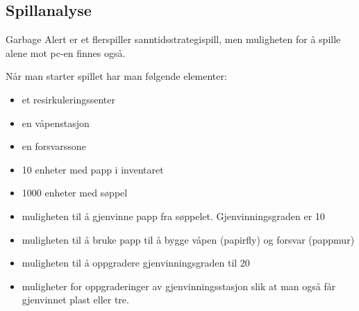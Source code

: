 

\subsection{Spillanalyse}

Garbage Alert er et flerspiller sanntidsstrategispill, men muligheten for å spille alene mot pc-en finnes også. 

Når man starter spillet har man følgende elementer:

\begin{itemize}
	\item et resirkuleringssenter
	\item en våpenstasjon
	\item en forsvarssone
	\item 10 enheter med papp i inventaret
	\item 1000 enheter med søppel
	\item muligheten til å gjenvinne papp fra søppelet. Gjenvinningsgraden er 10%
	\item muligheten til å bruke papp til å bygge våpen (papirfly) og forsvar (pappmur)
	\item muligheten til å oppgradere gjenvinningsgraden til 20%
	\item muligheter for oppgraderinger av gjenvinningsstasjon slik at man også får gjenvinnet plast eller tre.
\end{itemize}


